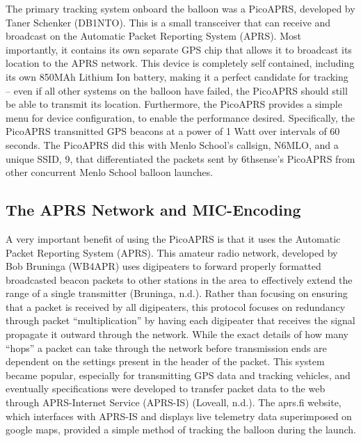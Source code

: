 \documentclass[12pt,]{article}
\begin{document}
The primary tracking system onboard the balloon was a PicoAPRS,
developed by Taner Schenker (DB1NTO). This is a small transceiver that
can receive and broadcast on the Automatic Packet Reporting System
(APRS). Most importantly, it contains its own separate GPS chip that
allows it to broadcast its location to the APRS network. This device is
completely self contained, including its own 850MAh Lithium Ion battery,
making it a perfect candidate for tracking -- even if all other systems
on the balloon have failed, the PicoAPRS should still be able to
transmit its location. Furthermore, the PicoAPRS provides a simple menu
for device configuration, to enable the performance desired.
Specifically, the PicoAPRS transmitted GPS beacons at a power of 1 Watt
over intervals of 60 seconds. The PicoAPRS did this with Menlo School's
callsign, N6MLO, and a unique SSID, 9, that differentiated the packets
sent by 6thsense's PicoAPRS from other concurrent Menlo School balloon
launches.

\subsection{The APRS Network and
MIC-Encoding}\label{the-aprs-network-and-mic-encoding}

A very important benefit of using the PicoAPRS is that it uses the
Automatic Packet Reporting System (APRS). This amateur radio network,
developed by Bob Bruninga (WB4APR) uses digipeaters to forward properly
formatted broadcasted beacon packets to other stations in the area to
effectively extend the range of a single transmitter (Bruninga, n.d.).
Rather than focusing on ensuring that a packet is received by all
digipeaters, this protocol focuses on redundancy through packet
``multiplication'' by having each digipeater that receives the signal
propagate it outward through the network. While the exact details of how
many ``hops'' a packet can take through the network before transmission
ends are dependent on the settings present in the header of the packet.
This system became popular, especially for transmitting GPS data and
tracking vehicles, and eventually specifications were developed to
transfer packet data to the web through APRS-Internet Service (APRS-IS)
(Loveall, n.d.). The aprs.fi website, which interfaces with APRS-IS and
displays live telemetry data superimposed on google maps, provided a
simple method of tracking the balloon during the launch.
\end{document}
